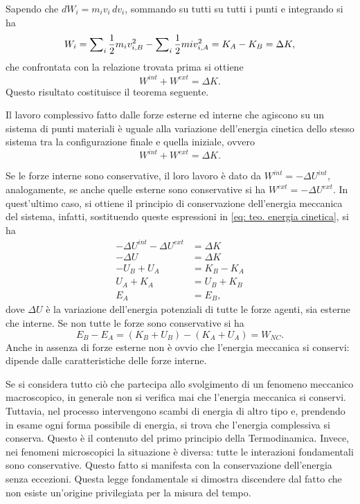 Sapendo che $dW_i=m_iv_i\,dv_i$, sommando su tutti su tutti i punti e integrando si ha
\begin{equation}
    W_i=\sum\nolimits_i\frac{1}{2}m_iv_{i,B}^2-\sum\nolimits_i\frac{1}{2}miv_{i,A}^2=K_A-K_B=\Delta K,
\end{equation}
che confrontata con la relazione trovata prima si ottiene
\begin{equation}
    W^{int}+W^{ext}=\Delta K.
\end{equation}
Questo risultato costituisce il teorema seguente.
\begin{teo}
    Il lavoro complessivo fatto dalle forze esterne ed interne che agiscono su un sistema di punti materiali è uguale alla variazione dell'energia cinetica dello stesso sistema tra la configurazione finale e quella iniziale, ovvero
    \begin{equation}
    \label{eq: teo. energia cinetica}
        W^{int}+W^{ext}=\Delta K.
    \end{equation}
\end{teo}
Se le forze interne sono conservative, il loro lavoro è dato da $W^{int}=-\Delta U^{int}$, analogamente, se anche quelle esterne sono conservative si ha $W^{ext}=-\Delta U^{ext}$. In quest'ultimo caso, si ottiene il principio di conservazione dell'energia meccanica del sistema, infatti, sostituendo queste espressioni in \eqref{eq: teo. energia cinetica}, si ha
\begin{equation}
    \begin{split}
        -\Delta U^{int}-\Delta U^{ext}&=\Delta K\\
        -\Delta U&=\Delta K \\
        -U_B+U_A&=K_B-K_A \\
        U_A+K_A&=U_B+K_B \\
        E_A&=E_B,
    \end{split}
\end{equation}
dove $\Delta U$ è la variazione dell'energia potenziali di tutte le forze agenti, sia esterne che interne. Se non tutte le forze sono conservative si ha 
\begin{equation}
    E_B-E_A=(K_B+U_B)-(K_A+U_A)=W_{NC}.
\end{equation}
Anche in assenza di forze esterne non è ovvio che l'energia meccanica si conservi: dipende dalle caratteristiche delle forze interne. 
\begin{obs}
    Se si considera tutto ciò che partecipa allo svolgimento di un fenomeno meccanico macroscopico, in generale non si verifica mai che l'energia meccanica si conservi. Tuttavia, nel processo intervengono scambi di energia di altro tipo e, prendendo in esame ogni forma possibile di energia, si trova che l'energia complessiva si conserva. Questo è il contenuto del primo principio della Termodinamica. Invece, nei fenomeni microscopici la situazione è diversa: tutte le interazioni fondamentali sono conservative. Questo fatto si manifesta con la conservazione dell'energia senza eccezioni. Questa legge fondamentale si dimostra discendere dal fatto che non esiste un'origine privilegiata per la misura del tempo.
\end{obs}

